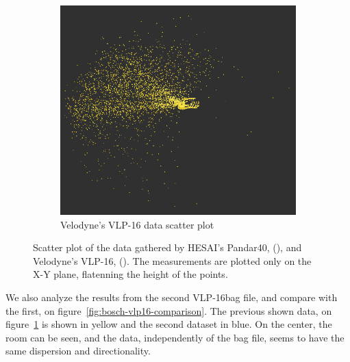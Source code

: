 \begin{figure}[ht!]
\begin{subfigure}[t]{0.45\textwidth}
		\includegraphics[width=\textwidth]{img/bosch/vlp16-test1.png}
		\caption{Velodyne's VLP-16 data scatter plot}
		\label{fig:bosch-vlp16-1}
	\end{subfigure}
	\caption{Scatter plot of the data gathered by HESAI's Pandar40, (), and Velodyne's VLP-16, (). The measurements are plotted only on the X-Y plane, flatenning the height of the points. }
	\label{fig:bosch-pandar-vs-vlp16}
\end{figure}

We also analyze the results from the second VLP-16bag file, and compare with the first, on figure~\ref{fig:bosch-vlp16-comparison}. The previous shown data, on figure~\ref{fig:bosch-vlp16-1} is shown in yellow and the second dataset in blue. On the center, the room can be seen, and the data, independently of the bag file, seems to have the same dispersion and directionality.

